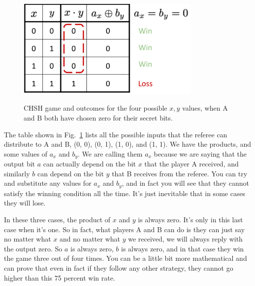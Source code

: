 \begin{figure}[H]
    \centering
    \includegraphics[width=0.8\textwidth]{lesson4/CHSH_annotated_table.pdf}
    \label{fig:chsh-table}
    \begin{center}
        \caption{CHSH game and outcomes for the four possible $x, y$ values, when A and B both have chosen zero for their secret bits.}
    \end{center}
\end{figure}

The table shown in Fig.~\ref{fig:chsh-table} lists all the possible inputs that the referee can distribute to A and B, (0, 0), (0, 1), (1, 0), and (1, 1). We have the products, and some values of $a_x$ and $b_y$. We are calling them $a_x$ because we are saying that the output bit $a$ can actually depend on the bit $x$ that the player A received, and similarly $b$ can depend on the bit $y$ that B receives from the referee. You can try and substitute any values for $a_x$ and $b_y$, and in fact you will see that they cannot satisfy the winning condition all the time. It's just inevitable that in some cases they will lose.

In these three cases, the product of $x$ and $y$ is always zero. It's only in this last case when it's one. So in fact, what players A and B can do is they can just say no matter what $x$ and no matter what $y$ we received, we will always reply with the output zero. So $a$ is always zero, $b$ is always zero, and in that case they win the game three out of four times. You can be a little bit more mathematical and can prove that even in fact if they follow any other strategy, they cannot go higher than this 75 percent win rate. 


